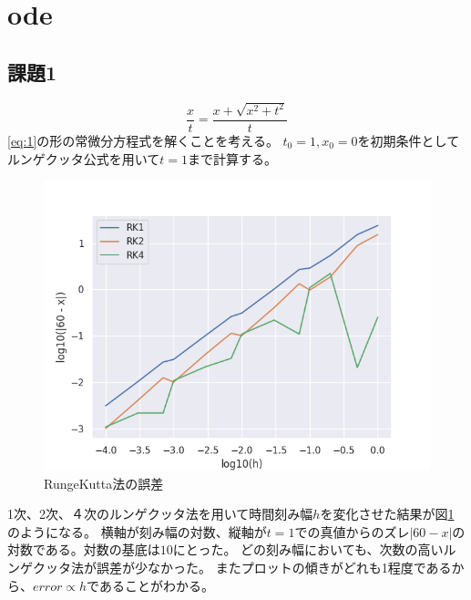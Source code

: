 \documentclass{jsarticle}
\date{\today}
\author{山田龍}
\title{}
\begin{document}
\maketitle
\section{ode}
\subsection{課題1}
\begin{equation}
    \frac{x}{t} = \frac{x + \sqrt{x^2 + t^2}}{t}
\end{equation}\label{eq:1}
\eqref{eq:1}の形の常微分方程式を解くことを考える。
$t_0=1,x_0 = 0$を初期条件としてルンゲクッタ公式を用いて$t=1$まで計算する。

\begin{figure}[htbp]
    \includegraphics[clip,width=15.0cm]{./runge_kutta_error.png}
    \caption{RungeKutta法の誤差}
    \label{fig:1}
\end{figure}
1次、2次、４次のルンゲクッタ法を用いて時間刻み幅$h$を変化させた結果が図\ref{fig:1}のようになる。
横軸が刻み幅の対数、縦軸が$t=1$での真値からのズレ$|60 - x|$の対数である。対数の基底は$10$にとった。
どの刻み幅においても、次数の高いルンゲクッタ法が誤差が少なかった。
またプロットの傾きがどれも1程度であるから、$error \propto h$であることがわかる。
\end{document}
